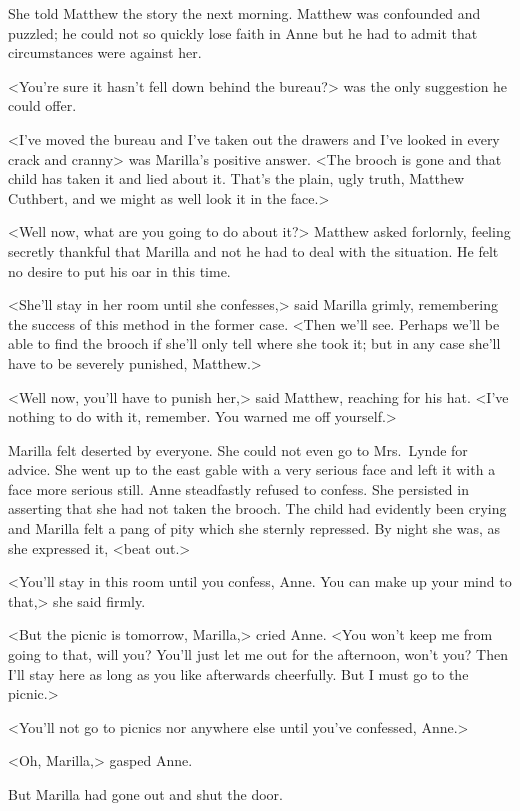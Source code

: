 She told Matthew the story the next morning. Matthew was confounded and puzzled; he could not so quickly lose faith in Anne but he had to admit that circumstances were against her.

<You're sure it hasn't fell down behind the bureau?> was the only suggestion he could offer.

<I've moved the bureau and I've taken out the drawers and I've looked in every crack and cranny> was Marilla's positive answer. <The brooch is gone and that child has taken it and lied about it. That's the plain, ugly truth, Matthew Cuthbert, and we might as well look it in the face.>

<Well now, what are you going to do about it?> Matthew asked forlornly, feeling secretly thankful that Marilla and not he had to deal with the situation. He felt no desire to put his oar in this time.

<She'll stay in her room until she confesses,> said Marilla grimly, remembering the success of this method in the former case. <Then we'll see. Perhaps we'll be able to find the brooch if she'll only tell where she took it; but in any case she'll have to be severely punished, Matthew.>

<Well now, you'll have to punish her,> said Matthew, reaching for his hat. <I've nothing to do with it, remember. You warned me off yourself.>

Marilla felt deserted by everyone. She could not even go to Mrs.~Lynde for advice. She went up to the east gable with a very serious face and left it with a face more serious still. Anne steadfastly refused to confess. She persisted in asserting that she had not taken the brooch. The child had evidently been crying and Marilla felt a pang of pity which she sternly repressed. By night she was, as she expressed it, <beat out.>

<You'll stay in this room until you confess, Anne. You can make up your mind to that,> she said firmly.

<But the picnic is tomorrow, Marilla,> cried Anne. <You won't keep me from going to that, will you? You'll just let me out for the afternoon, won't you? Then I'll stay here as long as you like afterwards cheerfully. But I must go to the picnic.>

<You'll not go to picnics nor anywhere else until you've confessed, Anne.>

<Oh, Marilla,> gasped Anne.

But Marilla had gone out and shut the door.

